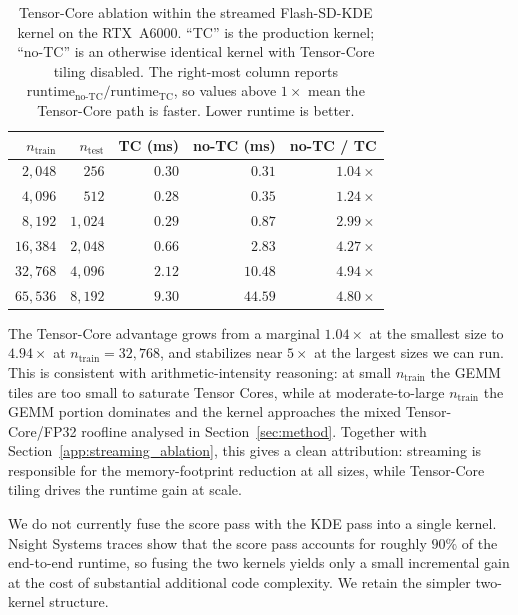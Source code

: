 \begin{table}[h]
  \centering
  \small
  \setlength{\tabcolsep}{4pt}
  \begin{tabular}{rrrrr}
    \toprule
    $n_{\text{train}}$ & $n_{\text{test}}$ &
    TC (ms) & no-TC (ms) & no-TC / TC \\
    \midrule
    $2{,}048$  & $256$    & $0.30$ & $0.31$  & $1.04\times$ \\
    $4{,}096$  & $512$    & $0.28$ & $0.35$  & $1.24\times$ \\
    $8{,}192$  & $1{,}024$  & $0.29$ & $0.87$  & $2.99\times$ \\
    $16{,}384$ & $2{,}048$  & $0.66$ & $2.83$  & $4.27\times$ \\
    $32{,}768$ & $4{,}096$  & $2.12$ & $10.48$ & $4.94\times$ \\
    $65{,}536$ & $8{,}192$  & $9.30$ & $44.59$ & $4.80\times$ \\
    \bottomrule
  \end{tabular}
  \caption{Tensor-Core ablation within the streamed Flash-SD-KDE kernel on
           the RTX~A6000.
           ``TC'' is the production kernel; ``no-TC'' is an otherwise
           identical kernel with Tensor-Core tiling disabled.
           The right-most column reports
           $\text{runtime}_{\text{no-TC}}/\text{runtime}_{\text{TC}}$, so
           values above $1\times$ mean the Tensor-Core path is faster.
           Lower runtime is better.}
  \label{tab:rebuttal_tc_ablation}
\end{table}

The Tensor-Core advantage grows from a marginal $1.04\times$ at the smallest
size to $4.94\times$ at $n_{\text{train}} = 32{,}768$, and stabilizes near
$5\times$ at the largest sizes we can run.
This is consistent with arithmetic-intensity reasoning: at small
$n_{\text{train}}$ the GEMM tiles are too small to saturate Tensor Cores,
while at moderate-to-large $n_{\text{train}}$ the GEMM portion dominates and
the kernel approaches the mixed Tensor-Core/FP32 roofline analysed in
Section~\ref{sec:method}.
Together with Section~\ref{app:streaming_ablation}, this gives a clean
attribution: streaming is responsible for the memory-footprint reduction at
all sizes, while Tensor-Core tiling drives the runtime gain at scale.

We do not currently fuse the score pass with the KDE pass into a single
kernel.
Nsight Systems traces show that the score pass accounts for roughly
$90\%$ of the end-to-end runtime, so fusing the two kernels yields only a
small incremental gain at the cost of substantial additional code complexity.
We retain the simpler two-kernel structure.


